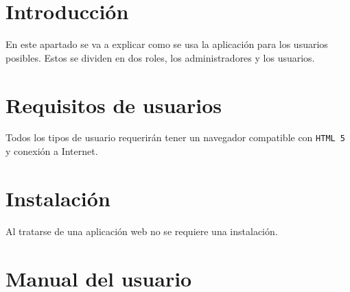 
\section{Introducción}

En este apartado se va a explicar como se usa la aplicación para los usuarios posibles. Estos se dividen en dos roles, los administradores y los usuarios.

\section{Requisitos de usuarios}

Todos los tipos de usuario requerirán tener un navegador compatible con \texttt{HTML 5} y conexión a Internet.

\section{Instalación}

Al tratarse de una aplicación web no se requiere una instalación.

\section{Manual del usuario}


